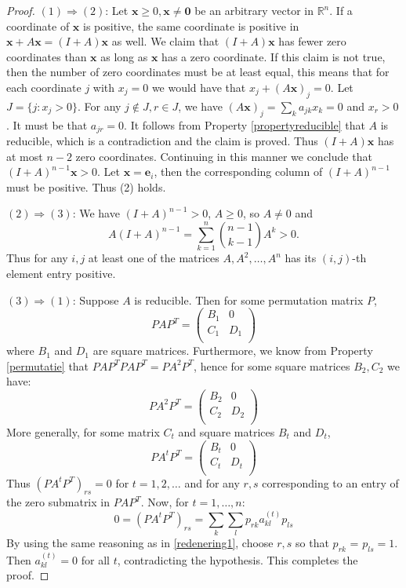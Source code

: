 \documentclass[a4paper,11pt]{report}
\newcommand{\R}{{\mathbb R}}
\begin{document}
\begin{proof}
  
  $(1) \Rightarrow (2)$: Let $\mathbf{x} \geq 0, \mathbf{x} \not = \mathbf{0}$ be an arbitrary vector in $\R^n$.
  If a coordinate of $\mathbf{x}$ is positive, the same coordinate is positive  in $\mathbf{x} + A\mathbf{x} = (I+A)\mathbf{x}$ 
  as well. We claim that $(I+A)\mathbf{x}$ has fewer zero coordinates than 
  $\mathbf{x}$ as long as $\mathbf{x}$ has a zero coordinate. If this claim is 
  not true, then the number of zero coordinates must be at least equal,
  this means that for each coordinate $j$ with $x_j = 0$ we would have that $x_j+ (A\mathbf{x})_j= 0$. Let $J = \{j: x_j > 0\}.$ For any $j \not \in J, r\in J$, we have 
  $(A\mathbf{x})_j = \sum_k a_{jk}x_k = 0$ and $x_r > 0$. 
  It must be that $a_{jr} = 0$. It follows from Property \ref{propertyreducible} that $A$ 
  is reducible, which is a contradiction and the claim is proved. Thus $(I+A)\mathbf{x}$ 
  has at most $n-2$ zero coordinates. Continuing in this manner we conclude that 
  $(I + A)^{n-1}\mathbf{x} > 0$. Let $\mathbf{x} = \mathbf{e}_i$, then the corresponding column of $(I+A)^{n-1}$ must be 
  positive. Thus (2) holds.
  
  $(2) \Rightarrow (3)$: We have $(I + A)^{n-1} > 0$, $A \geq 0$, so $A \not = 0$ 
  and 
  $$A(I+A)^{n-1} = \sum_{k=1}^n {n-1 \choose k-1} A^k > 0.$$
Thus for any $i, j$ at least one of the matrices $A, A^2,\ldots, A^n$ has its 
$(i,j)$-th element entry positive.

$(3) \Rightarrow (1)$: Suppose $A$ is reducible. Then for some permutation 
matrix $P$,
$$PAP^T = \begin{pmatrix}  B_1  & 0\\
 C_1  & D_1\\
\end{pmatrix} $$
where $B_1$ and $D_1$ are square matrices. Furthermore, we know from Property \ref{permutatie} that 
$PAP^TPAP^T = PA^2P^T$,
hence for some square matrices $B_2, C_2$ we have:
$$PA^2P^T = \begin{pmatrix}  B_2  & 0\\
 C_2  & D_2\\
\end{pmatrix} $$
More generally, for some matrix $C_t$ and square matrices $B_t$ and $D_t$,
$$PA^tP^T = \begin{pmatrix}  B_t  & 0\\
 C_t & D_t\\
\end{pmatrix} $$
Thus $(PA^tP^T)_{rs} = 0$ for $t = 1, 2,\ldots$ and for any $r,s$ 
corresponding to an entry of the zero submatrix in $PAP^T$.
Now, for $t = 1,\ldots,n:$
$$0 = (PA^tP^T)_{rs} = \sum_k\sum_l p_{r k}a_{kl}^{(t)}p_{l s}$$
By using the same reasoning as in \ref{redenering1}, choose $r,s$ so that $p_{r k}$ = $p_{l s} = 1$. Then $a^{(t)}_{kl} = 0$ for all $t$,
contradicting the hypothesis. This completes the proof. 
 \end{proof}
 
\end{document}
